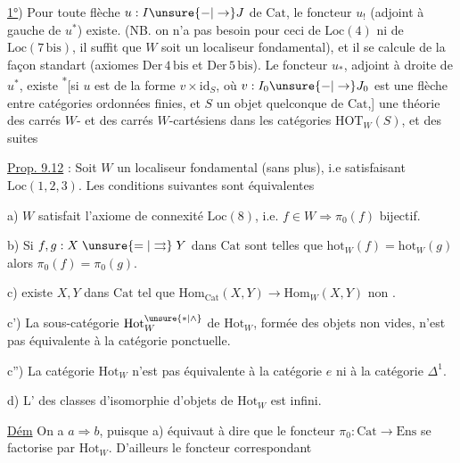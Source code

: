 \uline{1°})  Pour toute flèche
$u:I\unsure{-|\to}J$ de $\mathrm{Cat}$, le foncteur $u_!$ (adjoint
à gauche de $u^*$) existe. (NB. on n'a pas
besoin pour ceci de $\mathrm{Loc}(4)$ ni de $\mathrm{Loc}(7\,\mathrm{bis})$,
il suffit que $W$ soit un localiseur fondamental),
et il se calcule de la façon standart
(axiomes $\mathrm{Der}\,4\,\mathrm{bis}$ et $\mathrm{Der}\,5\,\mathrm{bis}$). Le foncteur
$u_*$, adjoint à droite de $u^*$, existe \textsuperscript{*}[si
$u$ est  de la forme $v\times\mathrm{id}_{S}$, où
$v:I_0\unsure{-|\to}J_0$ est une flèche entre catégories
ordonnées finies, et $S$ un objet quelconque
de $\mathrm{Cat}$,] 
 une théorie des
carrés $W$- et des carrés $W$-cartésiens
dans les catégories $\mathrm{HOT}_{W}(S)$, et des suites

\uline{Prop. 9.12} : Soit $W$ un localiseur fondamental (sans plus),
i.e satisfaisant $\mathrm{Loc}(1,2,3)$.  Les conditions
suivantes sont équivalentes

a) $W$ satisfait l'axiome de connexité $\mathrm{Loc}(8)$, i.e.
$f\in W\Longrightarrow\pi_0(f)$ bijectif.

b) Si $f,g:X\mathrel{\unsure{=|\rightrightarrows}}Y$ dans $\mathrm{Cat}$ sont telles que $\mathrm{hot}_{W}(f)=\mathrm{hot}_{W}(g)$
alors $\pi_0(f)=\pi_0(g)$.

c)  existe $X,Y$ dans $\mathrm{Cat}$ tel que  $\mathrm{Hom}_{\mathrm{Cat}}(X,Y)\to\mathrm{Hom}_{W}(X,Y)$ non .

c') La sous-catégorie $\mathrm{Hot}_{W}^{\unsure{*|\wedge}}$  de $\mathrm{Hot}_{W}$, formée des
objets  non vides, n'est pas équivalente à la catégorie
ponctuelle.

c'') La catégorie $\mathrm{Hot}_{W}$ n'est pas équivalente à la
catégorie $e$ ni à la catégorie $\Delta^1$.

d) L' des classes d'isomorphie d'objets de
$\mathrm{Hot}_{W}$ est infini.

\uline{Dém} On a $a\Longrightarrow b$, puisque a) équivaut à dire
que le foncteur $\pi_0:\mathrm{Cat}\to\mathrm{Ens}$ se factorise
par $\mathrm{Hot}_{W}$. D'ailleurs le foncteur correspondant

